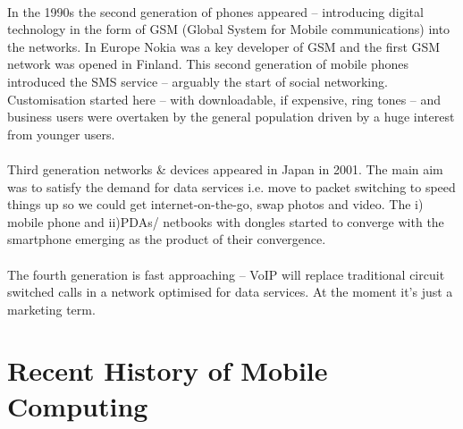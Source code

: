 \documentclass[12pt, a4paper, twoside]{book}
\begin{document}
\paragraph{} In the 1990s the second generation of phones appeared – introducing digital technology in the form of GSM (Global System for Mobile communications) into the networks. In Europe Nokia was a key developer of GSM and the first GSM network was opened in Finland. This second generation of mobile phones introduced the SMS service – arguably the start of social networking. Customisation started here – with downloadable, if expensive, ring tones – and business users were overtaken by the general population driven by a huge interest from younger users.

\paragraph{} Third generation networks \& devices appeared in Japan in 2001. The main aim was to satisfy the demand for data services  i.e. move to packet switching to speed things up so we could get internet-on-the-go, swap photos and video. The i) mobile phone and ii)PDAs/ netbooks with dongles started to converge with the smartphone emerging as the product of their convergence. 

\paragraph{} The fourth generation is fast approaching – VoIP will replace traditional circuit switched calls in a network optimised for data services. At the moment it’s just a marketing term.

\section{Recent History of Mobile Computing}
\end{document}
